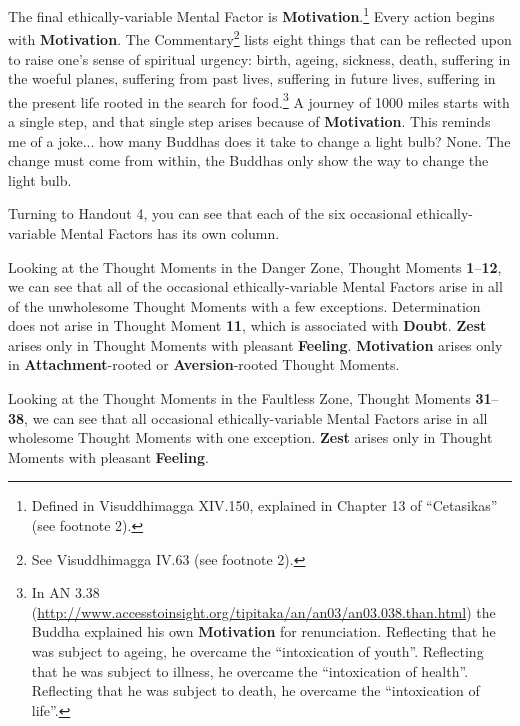 The final ethically-variable Mental Factor is \textbf{Motivation}.\footnote{Defined in Visuddhimagga XIV.150, explained in Chapter 13 of “Cetasikas” (see footnote 2).} Every action begins with \textbf{Motivation}. The Commentary\footnote{See Visuddhimagga IV.63 (see footnote 2).} lists eight things that can be reflected upon to raise one’s sense of spiritual urgency: birth, ageing, sickness, death, suffering in the woeful planes, suffering from past lives, suffering in future lives, suffering in the present life rooted in the search for food.\footnote{In AN 3.38 (\url{http://www.accesstoinsight.org/tipitaka/an/an03/an03.038.than.html}) the Buddha explained his own \textbf{Motivation} for renunciation. Reflecting that he was subject to ageing, he overcame the “intoxication of youth”. Reflecting that he was subject to illness, he overcame the “intoxication of health”. Reflecting that he was subject to death, he overcame the “intoxication of life”.} A journey of 1000 miles starts with a single step, and that single step arises because of \textbf{Motivation}. This reminds me of a joke... how many Buddhas does it take to change a light bulb? None. The change must come from within, the Buddhas only show the way to change the light bulb.

Turning to Handout 4, you can see that each of the six occasional ethically-variable Mental Factors has its own column.

Looking at the Thought Moments in the Danger Zone, Thought Moments \textbf{1}--\textbf{12}, we can see that all of the occasional ethically-variable Mental Factors arise in all of the unwholesome Thought Moments with a few exceptions. Determination does not arise in Thought Moment \textbf{11}, which is associated with \textbf{Doubt}. \textbf{Zest} arises only in Thought Moments with pleasant \textbf{Feeling}. \textbf{Motivation} arises only in \textbf{Attachment}-rooted or \textbf{Aversion}-rooted Thought Moments.

Looking at the Thought Moments in the Faultless Zone, Thought Moments \textbf{31}--\textbf{38}, we can see that all occasional ethically-variable Mental Factors arise in all wholesome Thought Moments with one exception. \textbf{Zest} arises only in Thought Moments with pleasant \textbf{Feeling}.

